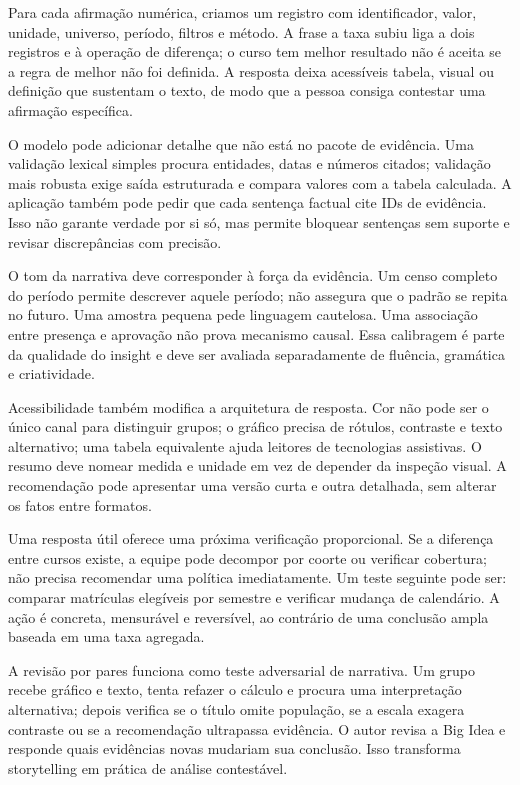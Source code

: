 Para cada afirmação numérica, criamos um registro com identificador, valor, unidade, universo, período, filtros e método. A frase a taxa subiu liga a dois registros e à operação de diferença; o curso tem melhor resultado não é aceita se a regra de melhor não foi definida. A resposta deixa acessíveis tabela, visual ou definição que sustentam o texto, de modo que a pessoa consiga contestar uma afirmação específica.

O modelo pode adicionar detalhe que não está no pacote de evidência. Uma validação lexical simples procura entidades, datas e números citados; validação mais robusta exige saída estruturada e compara valores com a tabela calculada. A aplicação também pode pedir que cada sentença factual cite IDs de evidência. Isso não garante verdade por si só, mas permite bloquear sentenças sem suporte e revisar discrepâncias com precisão.

O tom da narrativa deve corresponder à força da evidência. Um censo completo do período permite descrever aquele período; não assegura que o padrão se repita no futuro. Uma amostra pequena pede linguagem cautelosa. Uma associação entre presença e aprovação não prova mecanismo causal. Essa calibragem é parte da qualidade do insight e deve ser avaliada separadamente de fluência, gramática e criatividade.

Acessibilidade também modifica a arquitetura de resposta. Cor não pode ser o único canal para distinguir grupos; o gráfico precisa de rótulos, contraste e texto alternativo; uma tabela equivalente ajuda leitores de tecnologias assistivas. O resumo deve nomear medida e unidade em vez de depender da inspeção visual. A recomendação pode apresentar uma versão curta e outra detalhada, sem alterar os fatos entre formatos.

Uma resposta útil oferece uma próxima verificação proporcional. Se a diferença entre cursos existe, a equipe pode decompor por coorte ou verificar cobertura; não precisa recomendar uma política imediatamente. Um teste seguinte pode ser: comparar matrículas elegíveis por semestre e verificar mudança de calendário. A ação é concreta, mensurável e reversível, ao contrário de uma conclusão ampla baseada em uma taxa agregada.

A revisão por pares funciona como teste adversarial de narrativa. Um grupo recebe gráfico e texto, tenta refazer o cálculo e procura uma interpretação alternativa; depois verifica se o título omite população, se a escala exagera contraste ou se a recomendação ultrapassa evidência. O autor revisa a Big Idea e responde quais evidências novas mudariam sua conclusão. Isso transforma storytelling em prática de análise contestável.


